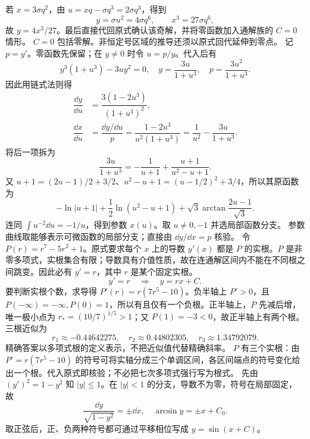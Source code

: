 若 $x=3\sigma q^2$，由 $u=xq-\sigma q^3=2\sigma q^3$，得到
\[
y=\sigma u^2=4\sigma q^6,
\qquad x^3=27\sigma q^6,
\]
故 $y=4x^3/27$。最后直接代回原式确认该奇解，并将零函数加入通解族的 $C=0$ 情形。
$C=0$ 包括零解。非恒定号区域的推导还须以原式回代延伸到零点。
记 $p=y'$。零函数先保留；在 $y\ne0$ 时令 $u=p/y$。代入后有
\[
y^3(1+u^3)-3uy^2=0,
\quad y=\dfrac{3u}{1+u^3},\quad p=\dfrac{3u^2}{1+u^3}.
\]
因此用链式法则得
\[
\begin{aligned}
\dfrac{\dd y}{\dd u}&=\dfrac{3(1-2u^3)}{(1+u^3)^2},\\
\dfrac{\dd x}{\dd u}&=\dfrac{\dd y/\dd u}{p}
=\dfrac{1-2u^3}{u^2(1+u^3)}
=\dfrac1{u^2}-\dfrac{3u}{1+u^3}.
\end{aligned}
\]
将后一项拆为
\[
\dfrac{3u}{1+u^3}=-\dfrac1{u+1}+\dfrac{u+1}{u^2-u+1}.
\]
又 $u+1=(2u-1)/2+3/2$、$u^2-u+1=(u-1/2)^2+3/4$，所以其原函数为
\[
-\ln|u+1|+\dfrac12\ln(u^2-u+1)
+\sqrt3\arctan\dfrac{2u-1}{\sqrt3}.
\]
连同 $\displaystyle \int u^{-2}\dd u=-1/u$，得到参数 $x(u)$。取 $u\ne0,-1$ 并选局部函数分支。
参数曲线取能够表示可微函数的局部分支；直接由 $\dd y/\dd x=p$ 核验。
令 $P(r)=r^7-5r^2+1$。原式要求每个 $x$ 上的导数 $y'(x)$ 都是 $P$ 的实根。$P$ 是非零多项式，实根集合有限；导数具有介值性质，故在连通解区间内不能在不同根之间跳变。因此必有 $y'=r$，其中 $r$ 是某个固定实根。
\[
y'=r\quad\Longrightarrow\quad y=rx+C.
\]
要判断实根个数，求导得 $P'(r)=r(7r^5-10)$。负半轴上 $P'>0$，且 $P(-\infty)=-\infty,P(0)=1$，所以有且仅有一个负根。正半轴上，$P$ 先减后增，唯一极小点为 $r_*=(10/7)^{1/5}>1$；又 $P(1)=-3<0$，故正半轴上有两个根。三根近似为
\[
r_1\approx-0.44642275,\quad r_2\approx0.44802305,\quad r_3\approx1.34792079.
\]
精确答案以多项式根的定义表示，不把近似值代替精确斜率。
$P$ 有三个实根：由 $P'=r(7r^5-10)$ 的符号可将实轴分成三个单调区间，各区间端点的符号变化给出一个根。代入原式即核验；不必把七次多项式强行写为根式。
先由 $(y')^2=1-y^2$ 知 $|y|\le1$。在 $|y|<1$ 的分支，导数不为零，符号在局部固定，故
\[
\dfrac{\dd y}{\sqrt{1-y^2}}=\pm\dd x,
\quad\arcsin y=\pm x+C_0.
\]
取正弦后，正、负两种符号都可通过平移相位写成 $y=\sin(x+C)$。

